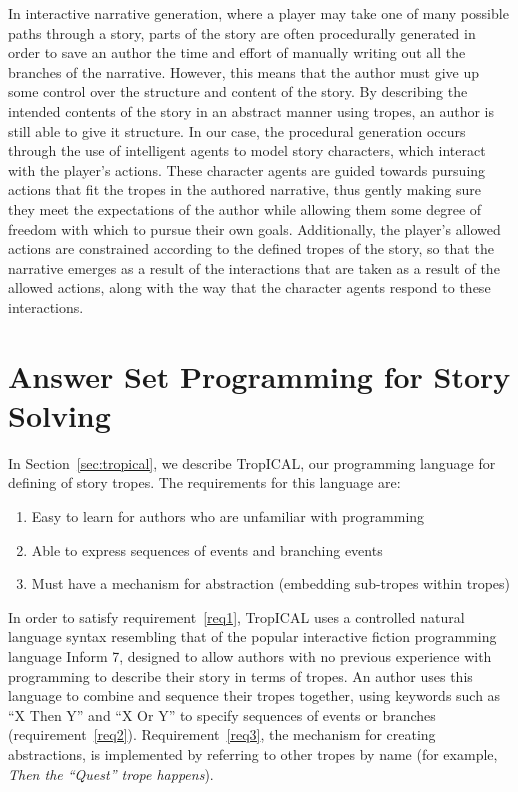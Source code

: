 \documentclass[11pt]{report}
\begin{document}
In interactive narrative generation, where a player may take one of many
possible paths through a story, parts of the story are often procedurally
generated in order to save an author the time and effort of manually writing out
all the branches of the narrative. However, this means that the author must give
up some control over the structure and content of the story. By describing the
intended contents of the story in an abstract manner using tropes, an author is
still able to give it structure. In our case, the procedural generation occurs
through the use of intelligent agents to model story characters, which interact
with the player's actions. These character
agents are guided towards pursuing actions that fit the tropes in the authored
narrative, thus gently making sure they meet the expectations of the author
while allowing them some degree of freedom with which to pursue their own goals.
Additionally, the player's allowed actions are constrained according to the
defined tropes of the story, so that the narrative emerges as a result of the
interactions that are taken as a result of the allowed actions, along with the
way that the character agents respond to these interactions.

\section{Answer Set Programming for Story Solving}
\label{sec:trope-interface}
In Section~\ref{sec:tropical}, we describe TropICAL, our programming language
for defining of story tropes. The requirements for this language are:

\begin{enumerate}
\item Easy to learn for authors who are unfamiliar with programming\label{req1}
  \item Able to express sequences of events and branching events\label{req2}
  \item Must have a mechanism for abstraction (embedding sub-tropes within tropes)\label{req3}
\end{enumerate}

In order to satisfy requirement~\ref{req1}, TropICAL uses a controlled
natural language syntax resembling that of the popular interactive fiction
programming language Inform 7, designed to allow authors with no previous
experience with programming to describe their story in terms of tropes. An
author uses this language to combine and sequence their tropes together, using
keywords such as ``X Then Y'' and ``X Or Y'' to specify sequences of events or
branches (requirement~\ref{req2}). Requirement~\ref{req3}, the mechanism for
creating abstractions, is implemented by referring to other tropes by name (for
example, \emph{Then the ``Quest'' trope happens}).
\end{document}
